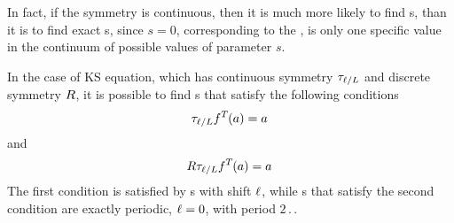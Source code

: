 In fact, if the symmetry is continuous, then it is much more likely
to find \rpo s, than it is to find exact \po s, since $s = 0$,
corresponding to the \po , is only one specific value in the
continuum of possible values of parameter $s$.

In the case of KS equation, which has continuous symmetry
$\tau_{\ell/L}$ and discrete symmetry $R$, it is possible to
find \rpo s that satisfy the following conditions
\[
  \tau_{\ell/L}f^{T_{}}(a) = a\,
\]
and
\[
  R\tau_{\ell/L}f^{T_{}}(a) = a\,
\]
The first condition is satisfied by \rpo s with shift $\ell$,
while \rpo s that satisfy the second condition are exactly periodic,
\ie $\ell = 0$, with period $2\period{}$.
